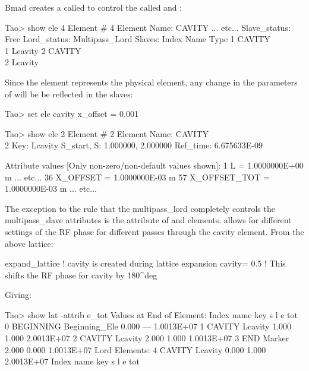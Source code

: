 \documentclass{hitec}
\begin{document}
Bmad creates a  called  to control the  called
 and :
{\small
\begin{code}
Tao> show ele 4
 Element #                4
 Element Name: CAVITY
... etc...
Slave_status: Free
Lord_status:  Multipass_Lord
Slaves:
   Index   Name        Type
       1   CAVITY\\1    Lcavity
       2   CAVITY\\2    Lcavity
\end{code}}

Since the  element represents the physical element, any change in the parameters of 
will be be reflected in the slaves:
{\small
\begin{code}
Tao> set ele cavity x_offset = 0.001

Tao> show ele 2
 Element #                2
 Element Name: CAVITY\\2
 Key: Lcavity
 S_start, S:    1.000000,    2.000000
 Ref_time:  6.675633E-09

 Attribute values [Only non-zero/non-default values shown]:
    1   L                            =  1.0000000E+00 m
... etc...
   36   X_OFFSET                     =  1.0000000E-03 m        57   X_OFFSET_TOT    =  1.0000000E-03 m
... etc...
\end{code}}

The exception to the rule that the multipass_lord completely controls the multipass_slave attributes
is the  attribute of  and  elements. 
allows for different settings of the RF phase for different passes through the cavity element.
From the above lattice:
{\small
\begin{code}
expand_lattice                 ! cavity\2 is created during lattice expansion
cavity = 0.5 ! This shifts the RF phase for cavity\2 by 180^deg
\end{code}}
Giving:
{\small
\begin{code}
Tao> show lat -attrib e_tot
      Values at End of Element:
 Index  name      key                      s       l           e
                                                             tot
     0  BEGINNING Beginning_Ele        0.000     ---  1.0013E+07
     1  CAVITY\1  Lcavity              1.000   1.000  2.0013E+07
     2  CAVITY\2  Lcavity              2.000   1.000  1.0013E+07
     3  END       Marker               2.000   0.000  1.0013E+07
Lord Elements:
     4  CAVITY    Lcavity              0.000   1.000  2.0013E+07
 Index  name      key                      s       l           e
                                                             tot
\end{code}}
\end{document}
